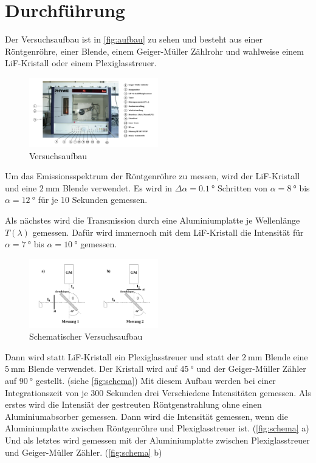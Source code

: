 \section{Durchführung}
\label{sec:Durchführung}


Der Versuchsaufbau ist in \autoref{fig:aufbau} zu sehen und besteht aus einer Röntgenröhre, einer Blende, einem Geiger-Müller Zählrohr und wahlweise einem LiF-Kristall oder einem Plexiglasstreuer.

\begin{figure}
    \centering
    \includegraphics[width=0.5\textwidth]{images/bild_3.png}
    \caption{Versuchsaufbau}
    \label{fig:aufbau}
\end{figure}

Um das Emissionsspektrum der Röntgenröhre zu messen, wird der LiF-Kristall und eine $\SI{2}{\milli\metre}$ Blende verwendet.
Es wird in $\Delta \alpha = \SI{0.1}{\degree}$ Schritten von $\alpha=\SI{8}{\degree}$ bis $\alpha = \SI{12}{\degree}$ für je 10 Sekunden gemessen.

Als nächstes wird die Transmission durch eine Aluminiumplatte je Wellenlänge $T(\lambda)$ gemessen.
Dafür wird immernoch mit dem LiF-Kristall die Intensität für $\alpha = \SI{7}{\degree}$ bis $\alpha = \SI{10}{\degree}$ gemessen.

\begin{figure}
    \centering
    \includegraphics[width=0.5\textwidth]{images/bild_4.png}
    \caption{Schematischer Versuchsaufbau}
    \label{fig:schema}
\end{figure}

Dann wird statt LiF-Kristall ein Plexiglasstreuer und statt der $\SI{2}{\milli\metre}$ Blende eine $\SI{5}{\milli\metre}$ Blende verwendet.
Der Kristall wird auf $\SI{45}{\degree}$ und der Geiger-Müller Zähler auf $\SI{90}{\degree}$ gestellt. (siehe \autoref{fig:schema})
Mit diesem Aufbau werden bei einer Integrationszeit von je 300 Sekunden drei Verschiedene Intensitäten gemessen.
Als erstes wird die Intensiät der gestreuten Röntgenstrahlung ohne einen Aluminiumabsorber gemessen.
Dann wird die Intensität gemessen, wenn die Aluminiumplatte zwischen Röntgenröhre und Plexiglasstreuer ist. (\autoref{fig:schema} a)
Und als letztes wird gemessen mit der Aluminiumplatte zwischen Plexiglasstreuer und Geiger-Müller Zähler. (\autoref{fig:schema} b)